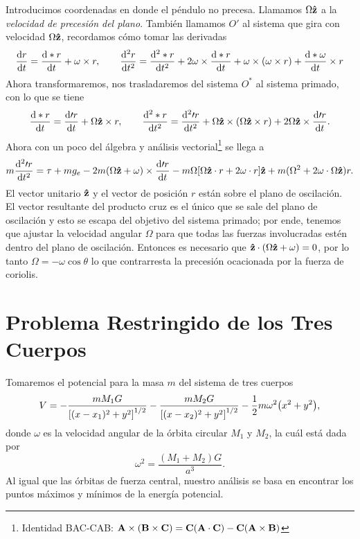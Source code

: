 Introducimos coordenadas en donde el péndulo no precesa. Llamamos $\Omega \vu{z}$ a la \textit{velocidad de precesión del plano}. También llamamos $O'$ al sistema que gira con velocidad $\Omega \vu{z}$, recordamos cómo tomar las derivadas
\begin{equation}
	\dv{r}{t} = \dv{*r}{t} + \omega \times r,\qquad	\dv[2]{r}{t} = \dv[2]{* r}{t} + 2\omega \times \dv{* r}{t} + \omega \times (\omega \times r) + \dv{* \omega}{t} \times r
\end{equation}
Ahora transformaremos, nos trasladaremos del sistema $O^*$ al sistema primado, con lo que se tiene
\begin{equation}
	\dv{*r}{t} = \dv{\prime r}{t} + \Omega \vu{z} \times r, \qquad \dv[2]{*r}{t} = \dv[2]{\prime r}{t} + \Omega \vu{z}\times (\Omega \vu{z} \times r) + 2\Omega \vu{z} \times \dv{\prime r}{t}.
\end{equation}
 Ahora con un poco del álgebra y análisis vectorial\footnote{Identidad BAC-CAB: $\vb{A} \times (\vb{B} \times \vb{C}) = \vb{C}(\vb{A}\cdot \vb{C}) - \vb{C} (\vb{A} \times \vb{B})$} se llega a 
\begin{equation}
	m\dv[2]{\prime r}{t} = \tau + mg_e - 2m (\Omega \vu{z} + \omega) \times \dv{\prime r}{t} - m\Omega \qty[\Omega \vu{z} \cdot r + 2\omega \cdot r]\vu{z} + m(\Omega ^2 + 2\omega \cdot \Omega \vu{z}) r.
\end{equation}
El vector unitario $\vu{z}$ y el vector de posición $r$ están sobre el plano de oscilación. El vector resultante del producto cruz es el único que se sale del plano de oscilación y esto se escapa del objetivo del sistema primado; por ende, tenemos que ajustar la velocidad angular $\Omega$ para que todas las fuerzas involucradas estén dentro del plano de oscilación. Entonces es necesario que $\vu{z} \cdot (\Omega \vu{z} + \omega) = 0$, por lo tanto $\Omega = -\omega \cos{\theta}$ lo que contrarresta la precesión ocacionada por la fuerza de coriolis.





\section{Problema Restringido de los Tres Cuerpos}
Tomaremos el potencial para la masa $m$ del sistema de tres cuerpos
\begin{equation}
	V = -\frac{mM_1 G}{\qty[(x - x_1)^2 + y^2]^{1/2}} - \frac{mM_2 G}{\qty[(x - x_2)^2 + y^2]^{1/2}} - \frac{1}{2} m\omega ^2 \qty(x^2 + y^2),
\end{equation}
donde $\omega$ es la velocidad angular de la órbita circular $M_1$ y $M_2$, la cuál está dada por
	\begin{equation}
		\omega ^2 = \frac{(M_1 + M_2) G}{a^3}.
	\end{equation}
Al igual que las órbitas de fuerza central, nuestro análisis se basa en encontrar los puntos máximos y mínimos de la energía potencial.\\

